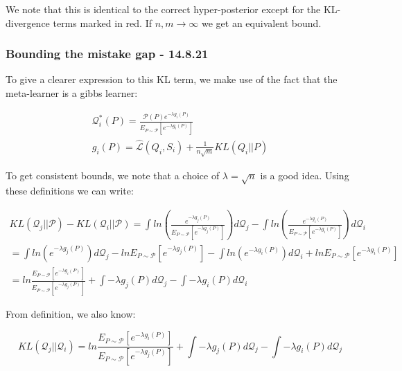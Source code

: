 \documentclass[letterpaper]{article}
\theoremstyle{definition}
\begin{document}
We note that this is identical to the correct hyper-posterior except for the KL-divergence terms marked in red. If $n,m\rightarrow \infty$ we get an equivalent bound.

\subsubsection*{Bounding the mistake gap - 14.8.21}

To give a clearer expression to this KL term, we make use of the fact that the meta-learner is a gibbs learner:

\begin{equation*}
\begin{split}
\mathcal{Q}^{*}_{i}(P)=\frac{\mathcal{P}(P) e^{-\lambda g_i(P)}}{E_{P\sim \mathcal{P}} \left [ e^{-\lambda g_i(P) } \right ]} \\
g_i(P)=\hat{\mathcal{L}}(Q_i,S_i)+ \frac{1}{n\sqrt{m}}KL(Q_i||P)
\end{split}
\end{equation*}

To get consistent bounds, we note that a choice of  $\lambda=\sqrt{n}$ is a good idea. Using these definitions we can write:

\begin{equation*}
\begin{split}
 KL(\mathcal{Q}_j||\mathcal{P})- KL(\mathcal{Q}_i||\mathcal{P})=\int ln \left ( \frac{e^{-\lambda g_j(P)}}{E_{P\sim \mathcal{P}} \left [ e^{-\lambda g_j(P) } \right ]} \right)d\mathcal{Q}_j - \int ln \left ( \frac{e^{-\lambda g_i(P)}}{E_{P\sim \mathcal{P}} \left [ e^{-\lambda g_i(P) } \right ]} \right)d\mathcal{Q}_i\\
 =\int ln \left ( e^{-\lambda g_j(P)} \right)d\mathcal{Q}_j - lnE_{P\sim \mathcal{P}} \left [ e^{-\lambda g_j(P) } \right ] - \int ln \left ( e^{-\lambda g_i(P)} \right)d\mathcal{Q}_i + lnE_{P\sim \mathcal{P}} \left [ e^{-\lambda g_i(P) } \right ]\\
 =ln\frac{E_{P\sim \mathcal{P}} \left [ e^{-\lambda g_i(P) } \right ]}{E_{P\sim \mathcal{P}} \left [ e^{-\lambda g_j(P) }\right ]}+\int -\lambda g_j(P) d\mathcal{Q}_j - \int -\lambda g_i(P) d\mathcal{Q}_i
\end{split}
\end{equation*}

From definition, we also know:

$$KL(\mathcal{Q}_j||\mathcal{Q}_i)= ln\frac{E_{P\sim \mathcal{P}} \left [ e^{-\lambda g_i(P) } \right ]}{E_{P\sim \mathcal{P}} \left [ e^{-\lambda g_j(P) }\right ]} +\int -\lambda g_j(P) d\mathcal{Q}_j - \int -\lambda g_i(P) d\mathcal{Q}_j $$
\end{document}

